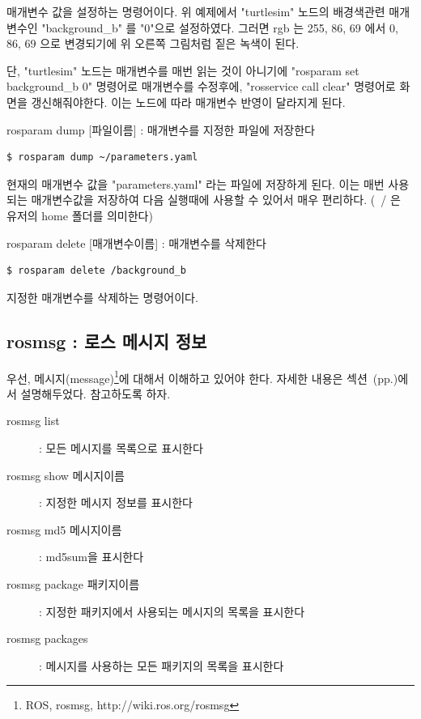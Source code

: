 \noindent
매개변수 값을 설정하는 명령어이다. 위 예제에서 "turtlesim" 노드의 배경색관련 매개변수인 "background\_b" 를 "0"으로 설정하였다. 그러면 rgb 는 255, 86, 69 에서 0, 86, 69 으로 변경되기에 위 오른쪽 그림처럼 짙은 녹색이 된다.

단, "turtlesim" 노드는 매개변수를 매번 읽는 것이 아니기에 "rosparam set background\_b 0" 명령어로 매개변수를 수정후에, "rosservice call clear" 명령어로 화면을 갱신해줘야한다. 이는 노드에 따라 매개변수 반영이 달라지게 된다.

\vspace{\baselineskip}
\noindent
{}\circled{\thenum} rosparam dump [파일이름] : 매개변수를 지정한 파일에 저장한다

\begin{lstlisting}[language=ROS]
$ rosparam dump ~/parameters.yaml
\end{lstlisting}

\noindent
현재의 매개변수 값을 "parameters.yaml" 라는 파일에 저장하게 된다. 이는 매번 사용되는 매개변수값을 저장하여 다음 실행때에 사용할 수 있어서 매우 편리하다. (~/ 은 유저의 home 폴더를 의미한다)

\vspace{\baselineskip}
\noindent
{}\circled{\thenum} rosparam delete [매개변수이름] : 매개변수를 삭제한다

\begin{lstlisting}[language=ROS]
$ rosparam delete /background_b
\end{lstlisting}

\noindent
지정한 매개변수를 삭제하는 명령어이다.

\subsection{rosmsg : 로스 메시지 정보}

우선, 메시지(message)\footnote{ROS, rosmsg, http://wiki.ros.org/rosmsg}에 대해서 이해하고 있어야 한다. 자세한 내용은 섹션~(pp.\pageref{def:RosMessage})에서 설명해두었다. 참고하도록 하자.

\vspace{\baselineskip}
\noindent
\begin{description}
\item[rosmsg list] : 모든 메시지를 목록으로 표시한다
\item[rosmsg show 메시지이름] : 지정한 메시지 정보를 표시한다
\item[rosmsg md5 메시지이름] : md5sum을 표시한다
\item[rosmsg package 패키지이름] : 지정한 패키지에서 사용되는 메시지의 목록을 표시한다
\item[rosmsg packages] : 메시지를 사용하는 모든 패키지의 목록을 표시한다
\end{description}

